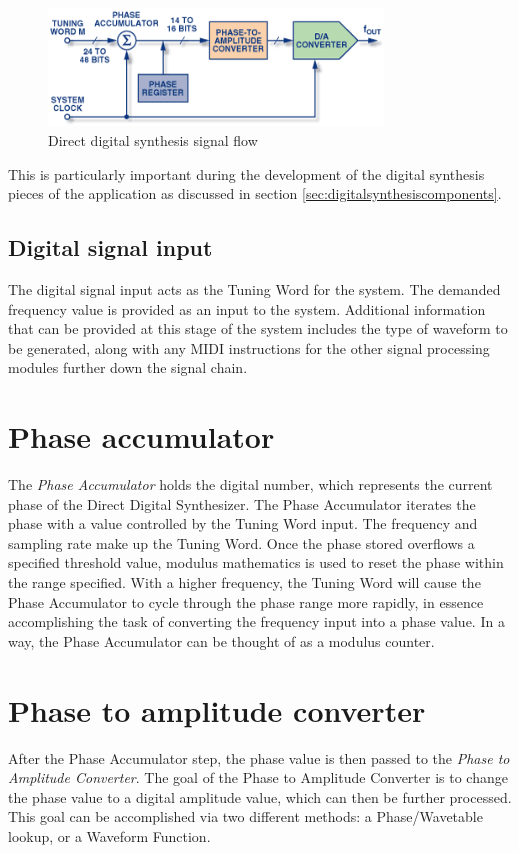 \documentclass[a4paper,12pt]{report}
\begin{document}
\begin{figure}
    \centering
    \includegraphics[width=24em]{DDS.png}
    \caption{Direct digital synthesis signal flow \cite{allaboutdds}}
    \label{fig:dds}
\end{figure}

This is particularly important during the development of the digital synthesis pieces of the application as discussed in section \ref{sec:digitalsynthesiscomponents}.

\subsection{Digital signal input}
\label{subsec:digitalsignalinput}
The digital signal input acts as the Tuning Word for the system. The demanded frequency value is provided as an input to the system. Additional information that can be provided at this stage of the system includes the type of waveform to be generated, along with any MIDI instructions for the other signal processing modules further down the signal chain.

\section{Phase accumulator}
\label{sec:phaseaccu}
The \emph{Phase \-Accumulator} holds the digital number, which represents the current phase of the Direct Digital Synthesizer. The Phase Accumulator iterates the phase with a value controlled by the Tuning Word input. The frequency and sampling rate make up the Tuning Word. Once the phase stored overflows a specified threshold value, modulus mathematics is used to reset the phase within the range specified. With a higher frequency, the Tuning Word will cause the Phase Accumulator to cycle through the phase range more rapidly, in essence accomplishing the task of converting the frequency input into a phase value. In a way, the Phase Accumulator can be thought of as a modulus counter.

\section{Phase to amplitude converter}
\label{sec:phasetoamplitudeconverter}
After the Phase Accumulator step, the phase value is then passed to the \emph{Phase \-to \-Amplitude Converter}. The goal of the Phase to Amplitude Converter is to change the phase value to a digital amplitude value, which can then be further processed. This goal can be accomplished via two different methods: a Phase/Wavetable lookup, or a Waveform Function.
\end{document}
